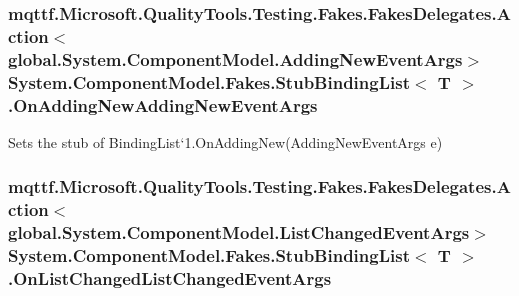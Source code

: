 \hypertarget{class_system_1_1_component_model_1_1_fakes_1_1_stub_binding_list_3_01_t_01_4_a96e520a430ebc63ad28f131bbcf77b9e}{
\subsubsection[{On\-Adding\-New\-Adding\-New\-Event\-Args}]{\setlength{\rightskip}{0pt plus 5cm}mqttf.\-Microsoft.\-Quality\-Tools.\-Testing.\-Fakes.\-Fakes\-Delegates.\-Action$<$global.\-System.\-Component\-Model.\-Adding\-New\-Event\-Args$>$ System.\-Component\-Model.\-Fakes.\-Stub\-Binding\-List$<$ T $>$.On\-Adding\-New\-Adding\-New\-Event\-Args}}\label{class_system_1_1_component_model_1_1_fakes_1_1_stub_binding_list_3_01_t_01_4_a96e520a430ebc63ad28f131bbcf77b9e}


Sets the stub of Binding\-List`1.On\-Adding\-New(\-Adding\-New\-Event\-Args e)

\hypertarget{class_system_1_1_component_model_1_1_fakes_1_1_stub_binding_list_3_01_t_01_4_a9326ade90d849a3cc5e14dcaca034ec1}{
\subsubsection[{On\-List\-Changed\-List\-Changed\-Event\-Args}]{\setlength{\rightskip}{0pt plus 5cm}mqttf.\-Microsoft.\-Quality\-Tools.\-Testing.\-Fakes.\-Fakes\-Delegates.\-Action$<$global.\-System.\-Component\-Model.\-List\-Changed\-Event\-Args$>$ System.\-Component\-Model.\-Fakes.\-Stub\-Binding\-List$<$ T $>$.On\-List\-Changed\-List\-Changed\-Event\-Args}}\label{class_system_1_1_component_model_1_1_fakes_1_1_stub_binding_list_3_01_t_01_4_a9326ade90d849a3cc5e14dcaca034ec1}



